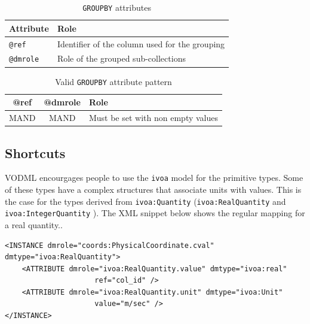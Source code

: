 \documentclass[11pt,a4paper]{ivoa}
\begin{document}
\begin{table}[!htbp]
\small
\centering
\begin{tabulary}{\linewidth}{|L|J|}
       \hline
           \textbf{Attribute} &  
           \textbf{Role} \\
       \hline  \hline
           \texttt{@ref}    & 
           Identifier of the column used for the grouping \\       
        \hline 
           \texttt{@dmrole}    & 
           Role of the grouped sub-collections\\       
        \hline 
\end{tabulary}
\caption{\texttt{GROUPBY} attributes} 
\label{tbl:group-att}
\end{table}

\begin{table}[!htbp]
\small
\centering
\begin{tabulary}{\linewidth}{|C|C|J|}
       \hline
           \textbf{@ref} & 
           \textbf{@dmrole} &  
           \textbf{Role} \\
        \hline   \hline
           MAND    &                       
           MAND    &            
           Must be set with non empty values \\       
       \hline 
\end{tabulary}
\caption{Valid \texttt{GROUPBY} attribute pattern} 
\label{tbl:group-patterns}
\end{table}


%
%

\subsection{Shortcuts}
VODML encourgages people to use the \texttt{ivoa} model for the primitive types. 
Some of these types have a complex structures that associate units with values. 
This is the case for the types derived from \texttt{ivoa:Quantity} (\texttt{ivoa:RealQuantity} and \texttt{ivoa:IntegerQuantity} ).
The XML snippet below shows the regular mapping for a real quantity..

\begin{lstlisting}[caption={ivoa:RealQuantity example},style=XML]
<INSTANCE dmrole="coords:PhysicalCoordinate.cval"
dmtype="ivoa:RealQuantity">
    <ATTRIBUTE dmrole="ivoa:RealQuantity.value" dmtype="ivoa:real"
                     ref="col_id" />
    <ATTRIBUTE dmrole="ivoa:RealQuantity.unit" dmtype="ivoa:Unit"
                     value="m/sec" />
</INSTANCE>
\end{lstlisting}
\end{document}
